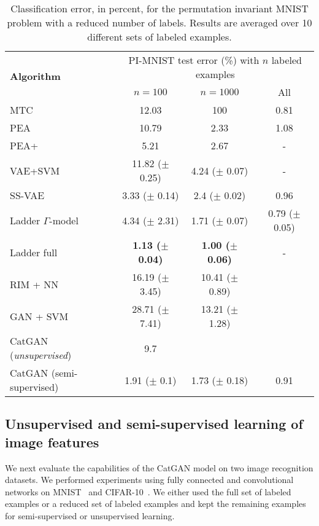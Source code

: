 \documentclass{article} \usepackage{iclr2016_conference,times}
\begin{document}
\begin{table}[t]
  \begin{tabular}{lccc}
    \multirow{2}{*}{\bf Algorithm} & \multicolumn{3}{c}{PI-MNIST
                                     test error (\%) with $n$ labeled examples} \\
    & $n = 100$ & $n = 1000$ & All  \\
    \hline
    MTC \citep{Rifai_2011} & 12.03 & 100 & 0.81 \\
    PEA \citep{Bachman_NIPS2014} & 10.79 & 2.33 & 1.08 \\
    PEA+ \citep{Bachman_NIPS2014} & 5.21 & 2.67 & -  \\
    VAE+SVM \citep{Kingma_NIPS2014} & 11.82 ($\pm$ 0.25) & 4.24 ($\pm$ 0.07) & - \\
    SS-VAE \citep{Kingma_NIPS2014} & 3.33 ($\pm$ 0.14) & 2.4 ($\pm$ 0.02) & 0.96
    \\
    Ladder $\Gamma$-model \citep{Rasmus_NIPS2015} & 4.34 ($\pm$ 2.31) & 1.71 ($\pm$ 0.07) & 0.79 ($\pm$ 0.05) \\
    Ladder full \citep{Rasmus_NIPS2015} & \textbf{1.13 ($\pm$ 0.04)} & \textbf{1.00 ($\pm$ 0.06)} & - \\
    \hline
    RIM + NN & 16.19 ($\pm$ 3.45)  & 10.41 ($\pm$ 0.89) \\ 
    GAN + SVM & 28.71 ($\pm$ 7.41) & 13.21 ($\pm$ 1.28) \\
    CatGAN (\emph{unsupervised}) & 9.7 & &  \\
    CatGAN (semi-supervised) & 1.91 ($\pm$ 0.1) & 1.73 ($\pm$ 0.18) & 0.91  \\  \end{tabular}
  \caption{Classification error, in percent, for the permutation invariant MNIST problem with a reduced number of labels. Results are averaged over 10 different sets of labeled examples.}
  \label{tab:pi_mnist}
\end{table}

\subsection{Unsupervised  and semi-supervised learning of image features}
We next evaluate the capabilities of the CatGAN model on two
image recognition datasets. We performed
experiments using fully connected and convolutional
networks on MNIST~\citep{LeCun_NC1989} and CIFAR-10~\citep{Krizhevsky2009}. We either used the full set of
labeled examples or a reduced set of labeled examples and kept
the remaining examples for semi-supervised or unsupervised learning.
\end{document}
